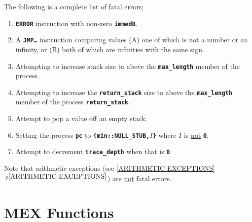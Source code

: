 \documentclass[12pt]{article}
\newcommand{\TT}[1]{{\tt \bfseries #1}}
\newcommand{\itemref}[1]{\ref{#1}$\,^{p\pageref{#1}}$}
\begin{document}
The following is a complete list of fatal errors;
\begin{enumerate}
\item \TT{ERROR} instruction with non-zero \TT{immedB}.
\item A \TT{JMP\ldots} instruction comparing values
(A) one of which is not a number or an infinity, or
(B) both of which are infinities with the same sign.
\item Attempting to increase stack size to above the \TT{max\_length}
member of the process.
\item Attempting to increase the \TT{return\_stack}
size to above the \TT{max\_length} member of the process \TT{return\_stack}.
\item Attempt to pop a value off an empty stack.
\item Setting the process \TT{pc} to \TT{\{min::NULL\_STUB,$I$\}} where
$I$ is \underline{not} \TT{0}.
\item Attempt to decrement \TT{trace\_depth} when that is \TT{0}.

\end{enumerate}

Note that arithmetic exceptions (see \itemref{ARITHMETIC-EXCEPTIONS})
are \underline{not} fatal errors.

\section{MEX Functions}
\label{MEX Functions}
\end{document}
